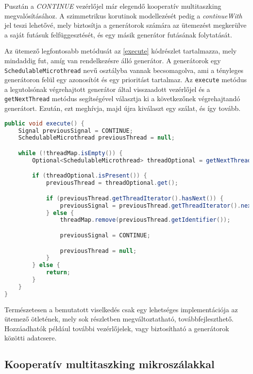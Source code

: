Pusztán a \textit{CONTINUE} vezérlőjel már elegendő kooperatív multitaszking megvalósításához. A szimmetrikus korutinok modellezését pedig a \textit{continueWith} jel teszi lehetővé, mely biztosítja a generátorok számára az ütemezést megkerülve a saját futásuk felfüggesztését, és egy másik generátor futásának folytatását.

Az ütemező legfontosabb metódusát az \ref{execute} kódrészlet tartalmazza, mely mindaddig fut, amíg van rendelkezésre álló generátor. A generátorok egy \texttt{SchedulableMicrothread} nevű osztályba vannak becsomagolva, ami a tényleges generátoron felül egy azonosítót és egy prioritást tartalmaz. Az \texttt{execute} metódus a legutolsónak végrehajtott generátor által visszaadott vezérlőjel és a \texttt{getNextThread} metódus segítségével választja ki a következőnek végrehajtandó generátort. Ezután, ezt meghívja, majd újra kiválaszt egy szálat, és így tovább.

\begin{lstlisting}[language=Java, caption={A generátorok ütemezését végző metódus}, escapechar=@, captionpos=b, aboveskip=1em, label=execute]
public void execute() {
    Signal previousSignal = CONTINUE;
    SchedulableMicrothread previousThread = null;

    while (!threadMap.isEmpty()) {
        Optional<SchedulableMicrothread> threadOptional = getNextThread(previousThread, previousSignal);

        if (threadOptional.isPresent()) {
            previousThread = threadOptional.get();

            if (previousThread.getThreadIterator().hasNext()) {
                previousSignal = previousThread.getThreadIterator().next();
            } else {
                threadMap.remove(previousThread.getIdentifier());

                previousSignal = CONTINUE;

                previousThread = null;
            }
        } else {
            return;
        }
    }
}
\end{lstlisting} 

Természetesen a bemutatott viselkedés csak egy lehetséges implementációja az ütemező ötletének, mely sok részletben megváltoztatható, továbbfejleszthető. Hozzáadhatók például további vezérlőjelek, vagy biztosítható a generátorok közötti adatcsere.

\subsection{Kooperatív multitaszking mikroszálakkal}

